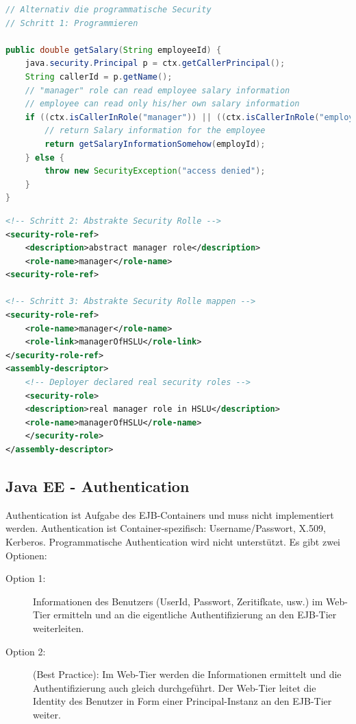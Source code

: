 \begin{lstlisting}[language=Java]
// Alternativ die programmatische Security
// Schritt 1: Programmieren

public double getSalary(String employeeId) {
	java.security.Principal p = ctx.getCallerPrincipal();
	String callerId = p.getName();
	// "manager" role can read employee salary information
	// employee can read only his/her own salary information
	if ((ctx.isCallerInRole("manager")) || ((ctx.isCallerInRole("employee")) && (callerId == employeeId))) {
		// return Salary information for the employee
		return getSalaryInformationSomehow(employId);
	} else {
		throw new SecurityException("access denied");
	}
}
\end{lstlisting}

\begin{lstlisting}[language=xml]
<!-- Schritt 2: Abstrakte Security Rolle -->
<security-role-ref>
	<description>abstract manager role</description>
	<role-name>manager</role-name>
<security-role-ref>

<!-- Schritt 3: Abstrakte Security Rolle mappen -->
<security-role-ref>
	<role-name>manager</role-name>
	<role-link>managerOfHSLU</role-link>
</security-role-ref>
<assembly-descriptor>
	<!-- Deployer declared real security roles -->
	<security-role>
	<description>real manager role in HSLU</description>
	<role-name>managerOfHSLU</role-name>
	</security-role>
</assembly-descriptor>
\end{lstlisting}

\subsection{Java EE - Authentication}
Authentication ist Aufgabe des EJB-Containers und muss nicht implementiert werden. Authentication ist Container-spezifisch: Username/Passwort, X.509, Kerberos. Programmatische Authentication wird nicht unterstützt. Es gibt zwei Optionen:

\begin{description}
	\item[Option 1:] Informationen des Benutzers (UserId, Passwort, Zeritifkate, usw.) im Web-Tier ermitteln und an die eigentliche Authentifizierung an den EJB-Tier weiterleiten. 
	\item[Option 2:] (Best Practice): Im Web-Tier werden die Informationen ermittelt und die Authentifizierung auch gleich durchgeführt. Der Web-Tier leitet die Identity des Benutzer in Form einer Principal-Instanz an den EJB-Tier weiter. 
\end{description}

